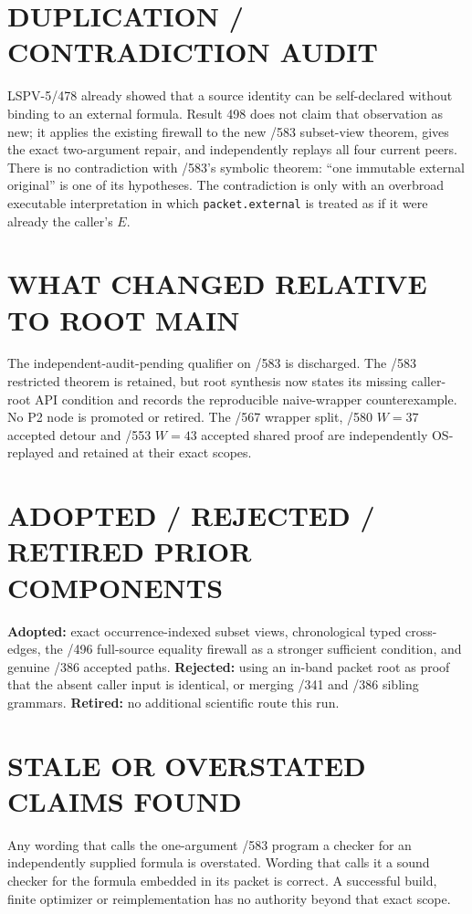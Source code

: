 \documentclass[11pt]{article}
\begin{document}
\section{DUPLICATION / CONTRADICTION AUDIT}
LSPV-5/478 already showed that a source identity can be self-declared without
binding to an external formula.  Result 498 does not claim that observation
as new; it applies the existing firewall to the new /583 subset-view theorem,
gives the exact two-argument repair, and independently replays all four
current peers.  There is no contradiction with /583's symbolic theorem:
``one immutable external original'' is one of its hypotheses.  The
contradiction is only with an overbroad executable interpretation in which
\texttt{packet.external} is treated as if it were already the caller's $E$.

\section{WHAT CHANGED RELATIVE TO ROOT MAIN}
The independent-audit-pending qualifier on /583 is discharged.  The /583
restricted theorem is retained, but root synthesis now states its missing
caller-root API condition and records the reproducible naive-wrapper
counterexample.  No P2 node is promoted or retired.  The /567 wrapper split,
/580 $W=37$ accepted detour and /553 $W=43$ accepted shared proof are
independently OS-replayed and retained at their exact scopes.

\section{ADOPTED / REJECTED / RETIRED PRIOR COMPONENTS}
\textbf{Adopted:} exact occurrence-indexed subset views, chronological typed
cross-edges, the /496 full-source equality firewall as a stronger sufficient
condition, and genuine /386 accepted paths.  \textbf{Rejected:} using an
in-band packet root as proof that the absent caller input is identical, or
merging /341 and /386 sibling grammars.  \textbf{Retired:} no additional
scientific route this run.

\section{STALE OR OVERSTATED CLAIMS FOUND}
Any wording that calls the one-argument /583 program a checker for an
independently supplied formula is overstated.  Wording that calls it a sound
checker for the formula embedded in its packet is correct.  A successful
build, finite optimizer or reimplementation has no authority beyond that
exact scope.
\end{document}
